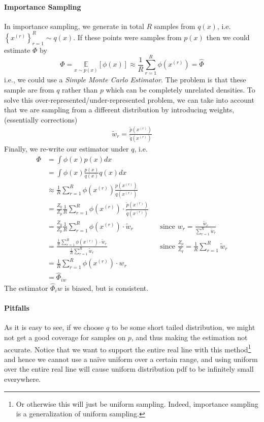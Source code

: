 \documentclass[11pt]{article}
\begin{document}
\paragraph{Importance Sampling}
In importance sampling, we generate in total $R$ samples from $q(x)$, i.e. $\left\{x^{(r)}\right\}_{r=1}^{R} \sim q(x)$. If these points were samples from $p(x)$ then we could estimate $\Phi$ by
\begin{equation}
    \Phi=\underset{x \sim p(x)}{\mathbb{E}}[\phi(x)] \approx \frac{1}{R} \sum_{r=1}^{R} \phi\left(x^{(r)}\right)=\hat{\Phi}
\end{equation}
i.e., we could use a \textit{{Simple Monte Carlo Estimator}}. The problem is that these sample are from $q$ rather than $p$ which can be completely unrelated densities. To solve this over-represented/under-represented problem, we can take into account that we are sampling from a different distribution by introducing weights, (essentially corrections)
\begin{align}
    \tilde{w}_{r}=\frac{\tilde{p}\left(x^{(r)}\right)}{\tilde{q}\left(x^{(r)}\right)}
\end{align}
Finally, we re-write our estimator under $q$, i.e.
\begin{align}
    \Phi 
    &= \int \phi(x) p(x) dx \\
    &= \int \phi(x) \frac{p(x)}{q(x)} q(x) dx \\
    &\approx \frac{1}{R} \sum_{r = 1}^R \phi (x^{(r)}) \frac{p\left(x^{(r)}\right)}{q\left(x^{(r)}\right)} \\
    &= \frac{Z_q}{Z_p} \frac{1}{R}\sum_{r=1}^R \phi(x^{(r)}) \cdot \frac{\tilde p(x^{(r)})}{\tilde q(x^{(r)})}\\ 
    &= \frac{Z_q}{Z_p} \frac{1}{R}\sum_{r=1}^R \phi(x^{(r)}) \cdot \tilde w_r  && \text{since } w_{r}=\frac{\tilde{w}_{r}}{\sum_{r=1}^{R} \tilde{w}_{r}}\\
    &= \frac{\frac{1}{R}\sum_{r=1}^R \phi(x^{(r)}) \cdot \tilde w_r}{\frac{1}{R}\sum_{r=1}^R \tilde w_r} && \text{since } \frac{Z_{p}}{Z_{q}}=\frac{1}{R} \sum_{r=1}^{R} \tilde{w}_{r}\\ 
    &= \frac{1}{R}\sum_{r=1}^R \phi(x^{(r)}) \cdot w_r \\ &= \hat \Phi_{iw}
\end{align}
The estimator $\hat \Phi_iw$ is biased, but is consistent.

\paragraph{Pitfalls} As it is easy to see, if we choose $q$ to be some short tailed distribution, we might not get a good coverage for samples on $p$, and thus making the estimation not accurate. Notice that we want to support the entire real line with this method\footnote{Or otherwise this will just be uniform sampling. Indeed, importance sampling is a generalization of uniform sampling. } and hence we cannot use a na\"ive uniform over a certain range, and using uniform over the entire real line will cause uniform distribution pdf to be infinitely small everywhere. 
\end{document}
